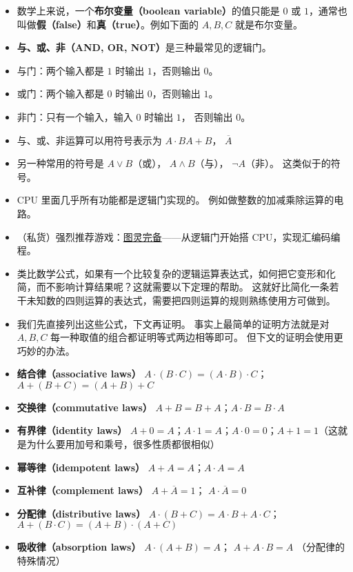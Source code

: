\begin{itemize}
\item 数学上来说，一个\textbf{布尔变量（boolean variable）}的值只能是 $0$ 或 $1$，通常也叫做\textbf{假（false）}和\textbf{真（true）}。例如下面的 $A,B,C$ 就是布尔变量。
\item \textbf{与、或、非（AND, OR, NOT）}是三种最常见的逻辑门。
\item 与门：两个输入都是 $1$ 时输出 $1$，否则输出 $0$。
\item 或门：两个输入都是 $0$ 时输出 $0$，否则输出 $1$。
\item 非门：只有一个输入，输入 $0$ 时输出 $1$， 否则输出 $0$。
\item 与、或、非运算可以用符号表示为 $A\cdot B$$A + B$， $\overline A$
\item 另一种常用的符号是 $A\lor B$（或）， $A\land B$（与）， $\neg A$（非）。 这类似于的符号。
\item CPU 里面几乎所有功能都是逻辑门实现的。 例如做整数的加减乘除运算的电路。
\item （私货）强烈推荐游戏：\href{https://turingcomplete.game/}{图灵完备}——从逻辑门开始搭 CPU，实现汇编码编程。
\item 类比数学公式，如果有一个比较复杂的逻辑运算表达式，如何把它变形和化简，而不影响计算结果呢？这就需要以下定理的帮助。 这就好比简化一条若干未知数的四则运算的表达式，需要把四则运算的规则熟练使用方可做到。
\item 我们先直接列出这些公式，下文再证明。 事实上最简单的证明方法就是对 $A,B,C$ 每一种取值的组合都证明等式两边相等即可。 但下文的证明会使用更巧妙的办法。
\item \textbf{结合律（associative laws）} $A\cdot(B\cdot C) = (A\cdot B)\cdot C$； $A+(B+C)=(A+B)+C$
\item \textbf{交换律（commutative laws）} $A+B=B+A$；$A\cdot B=B\cdot A$
\item \textbf{有界律（identity laws）} $A+0=A$；$A\cdot 1=A$；$A\cdot 0 = 0$；$A+1=1$（这就是为什么要用加号和乘号，很多性质都很相似）
\item \textbf{幂等律（idempotent laws）} $A+A=A$；$A\cdot A=A$
\item \textbf{互补律（complement laws）} $A+\overline A = 1$； $A\cdot \overline A = 0$
\item \textbf{分配律（distributive laws）} $A\cdot(B+C)=A\cdot B+A\cdot C$； $A+(B\cdot C) = (A+B)\cdot(A+C)$
\item \textbf{吸收律（absorption laws）} $A\cdot(A+B) = A$； $A+A\cdot B = A$ （分配律的特殊情况）
$$
\end{itemize}
